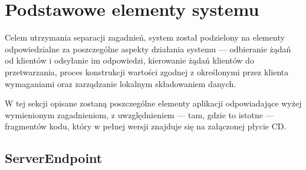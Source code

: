 \section{Podstawowe elementy systemu} \label{section:basicelements}

Celem utrzymania separacji zagadnień, system został podzielony na elementy odpowiedzialne za poszczególne aspekty działania systemu --- odbieranie żądań od klientów i odsyłanie im odpowiedzi, kierowanie żądań klientów do przetwarzania, proces konstrukcji wartości zgodnej z określonymi przez klienta wymaganiami oraz zarządzanie lokalnym składowaniem danych.

W tej sekcji opisane zostaną poszczególne elementy aplikacji odpowiadające wyżej wymienionym zagadnieniom, z uwzględnieniem --- tam, gdzie to istotne --- fragmentów kodu, który w pełnej wersji znajduje się na załączonej płycie CD.

\subsection{ServerEndpoint} \label{subection:serverendpoint}

